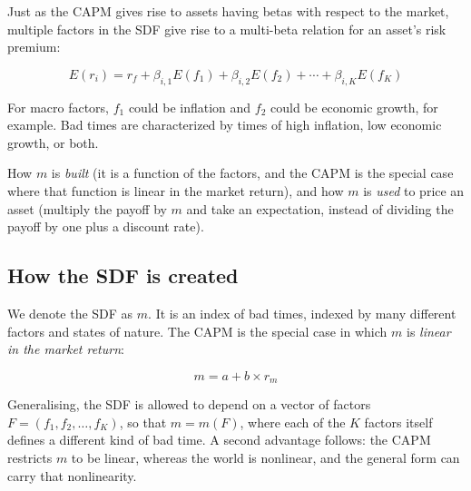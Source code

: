 Just as the CAPM gives rise to assets having betas with respect to the market,
multiple factors in the SDF give rise to a multi-beta relation for an asset's
risk premium:

\begin{imfmlbox}
\[ E(r_i) = r_f + \beta_{i,1}E(f_1) + \beta_{i,2}E(f_2) + \cdots + \beta_{i,K}E(f_K) \]
\end{imfmlbox}

For macro factors, $f_1$ could be inflation and $f_2$ could be economic growth,
for example. Bad times are characterized by times of high inflation, low economic
growth, or both.

\gapbadge
{}

\begin{imgapbox}[title={What the objective asks for}]
How $m$ is \emph{built} (it is a function of the factors, and the CAPM is the
special case where that function is linear in the market return), and how $m$ is
\emph{used} to price an asset (multiply the payoff by $m$ and take an
expectation, instead of dividing the payoff by one plus a discount rate).
\end{imgapbox}

\subsection{How the SDF is created}

We denote the SDF as $m$. It is an index of bad times, indexed by many different
factors and states of nature. The CAPM is the special case in which $m$ is
\emph{linear in the market return}:

\begin{imfmlbox}
\[ m = a + b \times r_m \]
\end{imfmlbox}

Generalising, the SDF is allowed to depend on a vector of factors
$F = (f_1, f_2, \ldots, f_K)$, so that $m = m(F)$, where each of the $K$ factors
itself defines a different kind of bad time. A second advantage follows: the
CAPM restricts $m$ to be linear, whereas the world is nonlinear, and the general
form can carry that nonlinearity.

